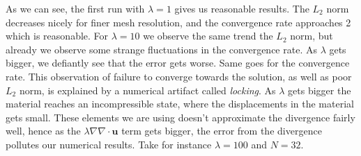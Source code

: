 \documentclass[a4paper,norsk]{article}
\begin{document}
As we can see, the first run with $\lambda = 1$ gives us reasonable results. The $L_2$ norm decreases nicely for finer mesh
resolution, and the convergence rate approaches 2 which is reasonable. For $\lambda = 10$ we observe the same trend the $L_2$ norm, but already we observe some strange fluctuations in the convergence rate.
As $\lambda$ gets bigger, we defiantly see that the error gets worse. Same goes for the convergence rate. This observation of failure to converge towards the solution, as well as poor $L_2$ norm, is explained by a numerical artifact called \textit{locking}. As $\lambda$ gets bigger the material reaches an 
incompressible state, where the displacements in the material gets small.
These elements we are using doesn't approximate the divergence fairly well, hence as the 
$\lambda \nabla \nabla \cdot \textbf{u}$ term gets bigger, the error from the divergence pollutes our numerical results. Take for 
instance $\lambda = 100$ and $N = 32$.
\end{document}
